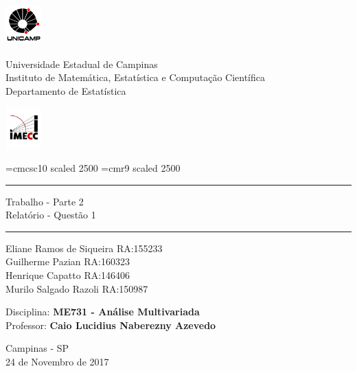 \documentclass[10pt,portuguese,]{article}
\title{}
\author{}
\date{}
\begin{document}
\begin{titlepage}
\thispagestyle{empty}
\begin{center}
\begin{center}
\begin{minipage}[s]{1.75cm}
\includegraphics[width=40pt,height=45pt]{logoUnicamp.png} 
\end{minipage}\begin{minipage}[s]{11.25cm}\noindent
{\begin{center} {\Large Universidade Estadual de Campinas}\\
{Instituto de Matemática, Estatística e Computação Científica}\\
{\sc Departamento de Estatística}
\end{center}}
\end{minipage}
\begin{minipage}[s]{0.5cm}
\includegraphics[width=40pt,height=45pt]{logoimecc.png}
\end{minipage}
\end{center}
\end{center}
\vspace{3cm}
\font\fontGrande=cmcsc10 scaled 2500
\font\pessoal=cmr9 scaled 2500

\begin{center}
\vspace*{3.5cm}
{\rule[0 ex]{16cm}{0.05cm}}
{\huge \sc Trabalho - Parte 2 \\[8pt]
Relatório - Questão 1}
{\rule[0 ex]{16cm}{0.05cm}}
\end{center}

\begin{center}

\normalsize \vspace{8mm}


\vspace{4cm}

{\sc  Eliane Ramos de Siqueira  RA:155233} \\
{\sc  Guilherme Pazian  RA:160323}\\
{\sc  Henrique Capatto  RA:146406}\\
{\sc  Murilo Salgado Razoli  RA:150987}

\vspace{0.2cm}

Disciplina: {\bf ME731 - Análise Multivariada}\\
Professor: {\bf Caio Lucidius Naberezny Azevedo}
\vspace{1cm}

{\footnotesize{Campinas - SP \\ 24 de Novembro de 2017}}
\end{center}
\end{titlepage}
\end{document}
